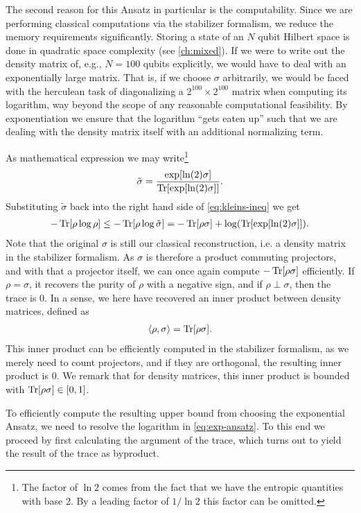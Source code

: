 The second reason for this Ansatz in particular is the computability. Since we
are performing classical computations via the stabilizer formalism, we reduce
the memory requirements significantly. Storing a state of an $N$ qubit Hilbert
space is done in quadratic space complexity (see \cref{ch:mixed}). If we were
to write out the density matrix of, e.g., $N=100$ qubits explicitly, we would
have to deal with an exponentially large matrix. That is, if we choose $\sigma$
arbitrarily, 
we would be faced with the herculean task of diagonalizing a $2^{100} \times
2^{100}$ matrix when computing its logarithm, way beyond the scope of any reasonable computational
feasibility. By exponentiation we ensure that the logarithm \enquote{gets eaten
up} such that we are dealing with the density matrix itself with an additional
normalizing term.

As mathematical expression we may write\footnote{The factor of $\ln 2$ comes
  from the fact that we have the entropic quantities with base $2$. By a
leading factor of $1 /\ln 2$ this factor can be omitted.}
\begin{align}
  \tilde{\sigma} = \frac{\exp[\ln(2) \sigma]}{\Tr[\exp[\ln(2) \sigma]]}
.\end{align}
Substituting $\tilde{\sigma}$ back into the right hand side of
\cref{eq:kleins-ineq} we get
\begin{align}\label{eq:exp-ansatz}
  -\Tr[\rho\log\rho]\leq-\Tr[\rho\log\tilde{\sigma}] = -\Tr[\rho\sigma] +
  \log(\Tr[\exp[\ln(2)\sigma]])
.\end{align}
Note that the original $\sigma$ is still our classical reconstruction, i.e. a
density matrix in the stabilizer formalism. As $\sigma$ is therefore a product
commuting projectors, and with that a projector itself, we can once again
compute $-\Tr[\rho\sigma]$ efficiently. If $\rho=\sigma$, it recovers the
purity of $\rho$ with a negative sign, and if $\rho \perp \sigma$, then the trace is $0$. In a
sense, we here have recovered an inner product between density matrices, defined
as
\begin{align}
  \langle \rho, \sigma \rangle = \Tr[\rho\sigma]
.\end{align}
This inner product can be efficiently computed in the stabilizer formalism, as
we merely need to count projectors, and if they are orthogonal, the resulting
inner product is $0$. We remark that for density matrices, this inner product
is bounded with $\Tr[\rho\sigma] \in [0,1]$.

To efficiently compute the resulting upper bound from choosing the exponential
Ansatz, we need to resolve the logarithm in \cref{eq:exp-ansatz}. To this end
we proceed by first calculating the argument of the trace, which turns out to
yield the result of the trace as byproduct.

